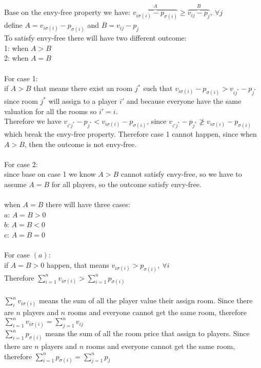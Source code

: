 \documentclass{article}
\begin{document}
Base on the envy-free property we have: $\overbrace{v_{i\sigma(i)}- p_{\sigma(i)}}^{A} \geq \overbrace{v_{ij} - p_j}^{B},\ \forall j$\\
define $A = v_{i\sigma(i)}- p_{\sigma(i)}$ and $B = v_{ij} - p_j$\\
To satisfy envy-free there will have two different outcome:\\
1: when $A>B$\\
2: when $A=B$\\\\
For case 1:\\
if $A > B$ that means there exist an room $j^*$ such that $v_{i\sigma(i)}- p_{\sigma(i)} > v_{ij^*} - p_{j^*}$\\
since room $j^*$ will assign to a player $i'$ and because everyone have the same valuation for all the rooms so $i' = i$.\\
Therefore we have $v_{i'j^*} - p_{j^*} < v_{i\sigma(i)} - p_{\sigma(i)}$,
since $v_{i'j^*} - p_{j^*} \not \geq v_{i\sigma(i)} - p_{\sigma(i)}$ which break the envy-free property.
Therefore case 1 cannot happen, since when $A > B$, then the outcome is not envy-free.\\\\
For case 2:\\
since base on case 1 we know $A > B$ cannot satisfy envy-free, so we have to assume $A = B$ for all players, so the outcome satisfy envy-free.\\\\
when $A = B$ there will have three cases:\\
$a$: $A = B > 0$\\
$b$: $A = B < 0$\\
$c$: $A = B = 0$\\\\
For case $(a)$:\\
if $A = B > 0$ happen, that means $v_{i\sigma(i)} > p_{\sigma(i)},\ \forall i$\\
Therefore $\sum_{i = 1}^n v_{i\sigma(i)} > \sum_{i = 1}^n p_{\sigma(i)}$\\\\
$\sum_{i}^n v_{i\sigma(i)}$ means the sum of all the player value their assign room. Since there are $n$ players and $n$ rooms and everyone cannot get the same room, therefore $\sum_{i = 1}^n v_{i\sigma(i)} = \sum_{j = 1}^n v_{ij}$\\
$\sum_{i = 1}^n p_{\sigma(i)}$ means the sum of all the room price that assign to players. Since there are $n$ players and $n$ rooms and everyone cannot get the same room, therefore $\sum_{i = 1}^n p_{\sigma(i)} = \sum_{j = 1}^n p_{j}$\\\\
\end{document}

